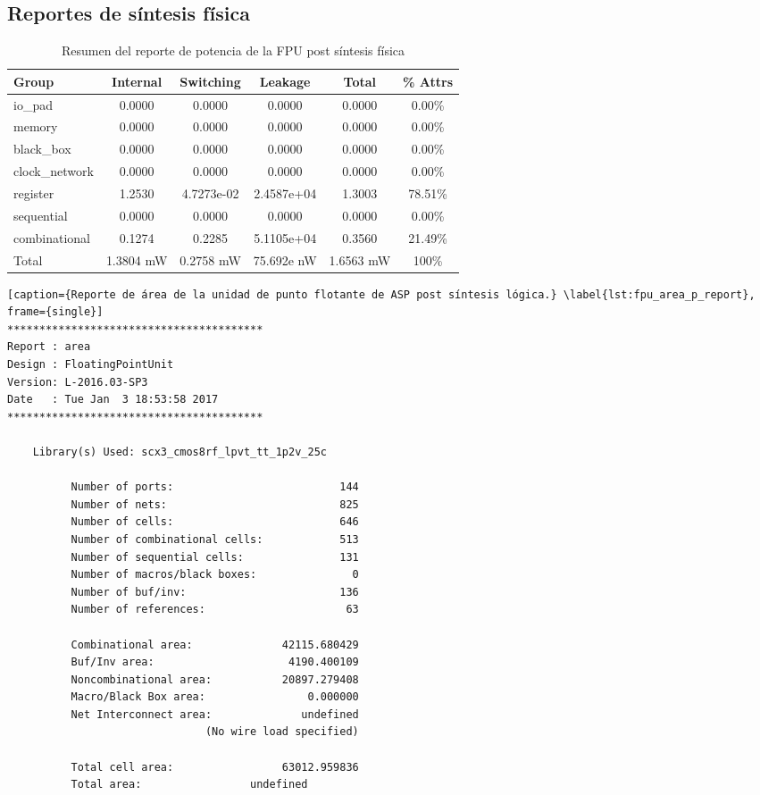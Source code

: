 \subsection{Reportes de síntesis física}
\begin{table}[ht]
\centering
\label{tab:fpu_pwr_p_tb}
\caption{Resumen del reporte de potencia de la FPU post síntesis física}
\begin{tabular}{||l | c | c | c | c | c |}
\hline
\hline
Group & Internal & Switching  & Leakage & Total & \% Attrs \\
\hline
io\_pad & 0.0000 & 0.0000 & 0.0000 & 0.0000 & 0.00\% \\
\hline
memory & 0.0000 & 0.0000 & 0.0000 & 0.0000 & 0.00\% \\
\hline
black\_box & 0.0000 & 0.0000 & 0.0000 & 0.0000 & 0.00\% \\
\hline
clock\_network & 0.0000 & 0.0000 & 0.0000 & 0.0000 & 0.00\% \\
\hline
register & 1.2530 & 4.7273e-02 & 2.4587e+04 & 1.3003 & 78.51\%\\
\hline
sequential  & 0.0000 & 0.0000 & 0.0000 & 0.0000 & 0.00\% \\
\hline
combinational & 0.1274 & 0.2285 & 5.1105e+04 & 0.3560 & 21.49\% \\
\hline
Total &  1.3804 mW & 0.2758 mW & 75.692e nW & 1.6563 mW & 100\%\\
\hline
\hline
\end{tabular}
\end{table}

\newpage

\begin{lstlisting}[caption={Reporte de área de la unidad de punto flotante de ASP post síntesis lógica.} \label{lst:fpu_area_p_report}, frame={single}]
****************************************
Report : area
Design : FloatingPointUnit
Version: L-2016.03-SP3
Date   : Tue Jan  3 18:53:58 2017
****************************************

	Library(s) Used: scx3_cmos8rf_lpvt_tt_1p2v_25c

          Number of ports:                          144
          Number of nets:                           825
          Number of cells:                          646
          Number of combinational cells:            513
          Number of sequential cells:               131
          Number of macros/black boxes:               0
          Number of buf/inv:                        136
          Number of references:                      63

          Combinational area:              42115.680429
          Buf/Inv area:                     4190.400109
          Noncombinational area:           20897.279408
          Macro/Black Box area:                0.000000
          Net Interconnect area:              undefined
                               (No wire load specified)

          Total cell area:                 63012.959836
          Total area:                 undefined
\end{lstlisting}

